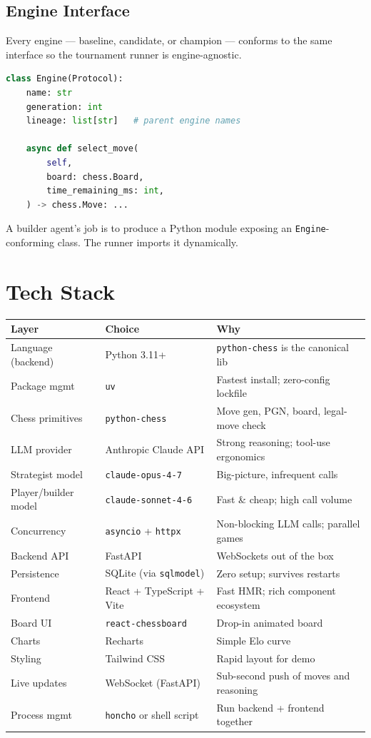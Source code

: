 \documentclass[11pt]{article}
\begin{document}
\subsection{Engine Interface}

Every engine --- baseline, candidate, or champion --- conforms to the same interface so the tournament runner is engine-agnostic.

\begin{lstlisting}[language=Python]
class Engine(Protocol):
    name: str
    generation: int
    lineage: list[str]   # parent engine names

    async def select_move(
        self,
        board: chess.Board,
        time_remaining_ms: int,
    ) -> chess.Move: ...
\end{lstlisting}

A builder agent's job is to produce a Python module exposing an \texttt{Engine}-conforming class. The runner imports it dynamically.

\section{Tech Stack}

\begin{center}
\begin{tabular}{@{}lll@{}}
\toprule
\textbf{Layer} & \textbf{Choice} & \textbf{Why} \\
\midrule
Language (backend) & Python 3.11+ & \texttt{python-chess} is the canonical lib \\
Package mgmt & \texttt{uv} & Fastest install; zero-config lockfile \\
Chess primitives & \texttt{python-chess} & Move gen, PGN, board, legal-move check \\
LLM provider & Anthropic Claude API & Strong reasoning; tool-use ergonomics \\
Strategist model & \texttt{claude-opus-4-7} & Big-picture, infrequent calls \\
Player/builder model & \texttt{claude-sonnet-4-6} & Fast \& cheap; high call volume \\
Concurrency & \texttt{asyncio} + \texttt{httpx} & Non-blocking LLM calls; parallel games \\
Backend API & FastAPI & WebSockets out of the box \\
Persistence & SQLite (via \texttt{sqlmodel}) & Zero setup; survives restarts \\
Frontend & React + TypeScript + Vite & Fast HMR; rich component ecosystem \\
Board UI & \texttt{react-chessboard} & Drop-in animated board \\
Charts & Recharts & Simple Elo curve \\
Styling & Tailwind CSS & Rapid layout for demo \\
Live updates & WebSocket (FastAPI) & Sub-second push of moves and reasoning \\
Process mgmt & \texttt{honcho} or shell script & Run backend + frontend together \\
\bottomrule
\end{tabular}
\end{center}
\end{document}
